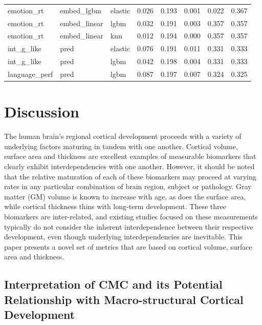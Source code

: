 \documentclass{article}
\begin{document}
\begin{table}[H]
\begin{tabular}{lllrrrrr}
	emotion\_rt & embed\_lgbm & elastic & 0.026 & 0.193 & 0.001 & 0.022 & 0.367 \\
	emotion\_rt & embed\_linear & lgbm & 0.032 & 0.191 & 0.003 & 0.357 & 0.357 \\
	emotion\_rt & embed\_linear & knn & 0.012 & 0.194 & 0.000 & 0.357 & 0.357 \\
	int\_g\_like & pred & elastic & 0.076 & 0.191 & 0.011 & 0.331 & 0.333 \\
	int\_g\_like & pred & lgbm & 0.042 & 0.198 & 0.004 & 0.331 & 0.333 \\
	language\_perf & pred & lgbm & 0.087 & 0.197 & 0.007 & 0.324 & 0.325 \\
	\bottomrule
\end{tabular}
\label{tab:cmc-feature-select}
\end{table}


\section{Discussion} \label{sec:discussion}

The human brain's regional cortical development proceeds with a variety of
underlying factors maturing in tandem with one another. Cortical volume,
surface area and thickness are excellent examples of measurable biomarkers
that clearly exhibit interdependencies with one another. However, it should
be noted that the relative maturation of each of these biomarkers may proceed
at varying rates in any particular combination of brain region, subject or
pathology. Gray matter (GM) volume is known to increase with age, as does the
surface area, while cortical thickness thins with long-term development.
These three biomarkers are inter-related, and existing studies focused on
these measurements typically do not consider the inherent interdependence
between their respective development, even though underlying
interdependencies are inevitable. This paper presents a novel set of metrics
that are based on cortical volume, surface area and thickness.

\subsection{Interpretation of CMC and its Potential Relationship with Macro-structural Cortical Development}
\end{document}
